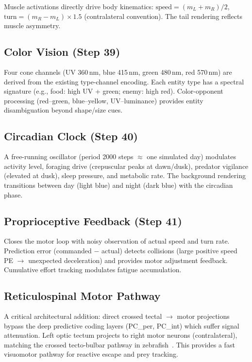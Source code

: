 \documentclass[11pt,a4paper]{article}
\begin{document}
Muscle activations directly drive body kinematics:
$\text{speed} = (m_L + m_R)/2$, $\text{turn} = (m_R - m_L) \times 1.5$
(contralateral convention).  The tail rendering reflects muscle asymmetry.

\subsection{Color Vision (Step 39)}

Four cone channels (UV 360\,nm, blue 415\,nm, green 480\,nm, red 570\,nm)
are derived from the existing type-channel encoding.  Each entity type
has a spectral signature (e.g., food: high UV + green; enemy: high red).
Color-opponent processing (red--green, blue--yellow, UV--luminance)
provides entity disambiguation beyond shape/size cues.

\subsection{Circadian Clock (Step 40)}

A free-running oscillator (period 2000 steps $\approx$ one simulated day)
modulates activity level, foraging drive (crepuscular peaks at dawn/dusk),
predator vigilance (elevated at dusk), sleep pressure, and metabolic rate.
The background rendering transitions between day (light blue) and night
(dark blue) with the circadian phase.

\subsection{Proprioceptive Feedback (Step 41)}

Closes the motor loop with noisy observation of actual speed and turn rate.
Prediction error (commanded $-$ actual) detects collisions (large positive
speed PE $\to$ unexpected deceleration) and provides motor adjustment
feedback.  Cumulative effort tracking modulates fatigue accumulation.

\subsection{Reticulospinal Motor Pathway}

A critical architectural addition: direct crossed tectal $\to$ motor
projections bypass the deep predictive coding layers (PC\_per, PC\_int)
which suffer signal attenuation.  Left optic tectum projects to right
motor neurons (contralateral), matching the crossed tecto-bulbar pathway
in zebrafish~\cite{orger2008}.  This provides a fast visuomotor pathway
for reactive escape and prey tracking.
\end{document}
